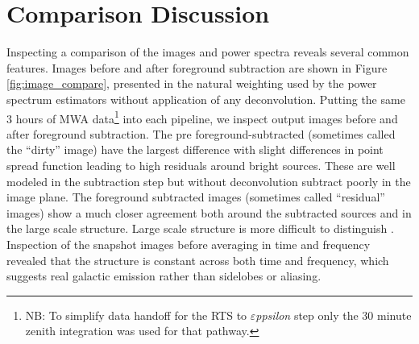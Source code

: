 \documentclass[twolcolumn,iop]{emulateapj}
\def\eppsilon{{\it $\varepsilon$ppsilon}}
\begin{document}
\section{Comparison Discussion}
\label{sec:results}
Inspecting a comparison of the images and power spectra reveals several common features. Images before and after foreground subtraction are shown in Figure \ref{fig:image_compare}, presented in the natural weighting used by the power spectrum estimators without application of any deconvolution.  Putting the same 3 hours of MWA data\footnote{NB: To simplify data handoff for the RTS to \eppsilon{} step only the 30 minute zenith integration was used for that pathway.} into each pipeline, we inspect output images before and after foreground subtraction. The pre foreground-subtracted (sometimes called the ``dirty'' image) have the largest difference with slight differences in point spread function leading to high residuals around bright sources. These are well modeled in the subtraction step but without deconvolution subtract poorly in the image plane.  The foreground subtracted images (sometimes called ``residual'' images) show a much closer agreement both around the subtracted sources and in the large scale structure. Large scale structure is more difficult to distinguish . Inspection of the snapshot images before averaging in time and frequency revealed that the structure is constant across both time and frequency, which suggests real galactic emission rather than sidelobes or aliasing.  



\end{document}
